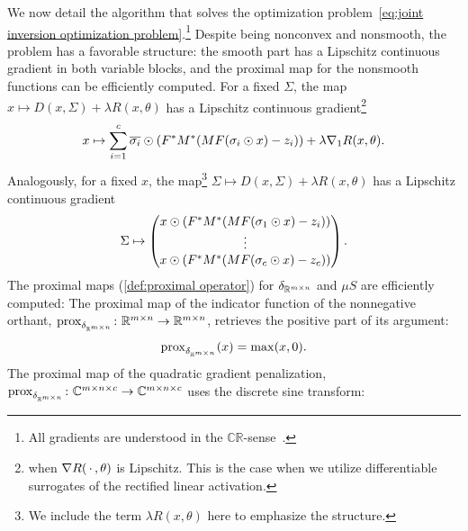 We now detail the algorithm that solves the optimization problem~\cref{eq:joint inversion optimization problem}.\footnote{%
	All gradients are understood in the \( \mathbb{C}\mathbb{R} \)-sense~\cite{kreutz_complex_2009}.%
}
Despite being nonconvex and nonsmooth, the problem has a favorable structure:
the smooth part has a Lipschitz continuous gradient in both variable blocks, and the proximal map for the nonsmooth functions can be efficiently computed.
For a fixed \( \Sigma \), the map \( x \mapsto D(x, \Sigma) + \lambda R(x, \theta) \) has a Lipschitz continuous gradient\footnote{%
	when \( \nabla R(\,\cdot\,, \theta) \) is Lipschitz.
	This is the case when we utilize differentiable surrogates of the rectified linear activation.
}
\begin{equation}
	x \mapsto \sum_{i=\num{1}}^c \overline{\sigma_i} \odot (F^{\ast}M^{\ast}(MF(\sigma_i\odot x) - z_i)) + \lambda \nabla_{\num{1}} R(x, \theta).
\end{equation}
Analogously, for a fixed \( x \), the map\footnote{We include the term \( \lambda R(x, \theta) \) here to emphasize the structure.} \( \Sigma \mapsto D(x, \Sigma) + \lambda R(x, \theta) \) has a Lipschitz continuous gradient
\begin{equation}
	\Sigma \mapsto \begin{pmatrix}
		x \odot (\Adjoint{\Fourier}\Adjoint{\Mask}(\Mask\Fourier(\sigma_{\num{1}}\odot x) - z_i)) \\
		\vdotswithin{%
			x \odot (\Adjoint{\Fourier}\Adjoint{\Mask}(\Mask\Fourier(\sigma_i\odot x) - z_{\num{1}}))
		} \\
		x \odot (\Adjoint{\Fourier}\Adjoint{\Mask}(\Mask\Fourier(\sigma_c\odot x) - z_c)) \\
	\end{pmatrix}.
\end{equation}
The proximal maps (\cref{def:proximal operator}) for \( \delta_{\mathbb{R}^{m\times n}} \) and \( \mu S \) are efficiently computed:
The proximal map of the indicator function of the nonnegative orthant, \( \operatorname{prox}_{\delta_{\mathbb{R}^{m\times n}}} \colon \mathbb{R}^{m\times n} \to \mathbb{R}^{m\times n} \), retrieves the positive part of its argument:
\begin{equation}
	\operatorname{prox}_{\delta_{\mathbb{R}^{m\times n}}}(x) = \max(x, \num{0}).
\end{equation}
The proximal map of the quadratic gradient penalization, \( \operatorname{prox}_{\delta_{\mathbb{R}^{m\times n}}} \colon \mathbb{C}^{m\times n \times c} \to \mathbb{C}^{m\times n \times c} \) uses the discrete sine transform:
